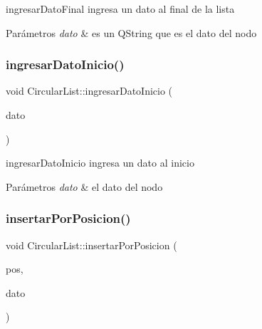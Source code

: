 ingresar\+Dato\+Final ingresa un dato al final de la lista 


\begin{DoxyParams}{Parámetros}
{\em dato} & es un Q\+String que es el dato del nodo \\
\hline
\end{DoxyParams}
\mbox{\label{class_circular_list_a4d498cd4c405704101003b90d782bb93}} 
\subsubsection{\texorpdfstring{ingresar\+Dato\+Inicio()}{ingresarDatoInicio()}}
{\footnotesize\ttfamily void Circular\+List\+::ingresar\+Dato\+Inicio (\begin{DoxyParamCaption}\item[{Q\+String}]{dato }\end{DoxyParamCaption})\hspace{0.3cm}{\ttfamily [inline]}}



ingresar\+Dato\+Inicio ingresa un dato al inicio 


\begin{DoxyParams}{Parámetros}
{\em dato} & el dato del nodo \\
\hline
\end{DoxyParams}
\mbox{\label{class_circular_list_ad2dd3f4b5934900494ba50714306a89f}} 
\subsubsection{\texorpdfstring{insertar\+Por\+Posicion()}{insertarPorPosicion()}}
{\footnotesize\ttfamily void Circular\+List\+::insertar\+Por\+Posicion (\begin{DoxyParamCaption}\item[{int}]{pos,  }\item[{Q\+String}]{dato }\end{DoxyParamCaption})\hspace{0.3cm}{\ttfamily [inline]}}



